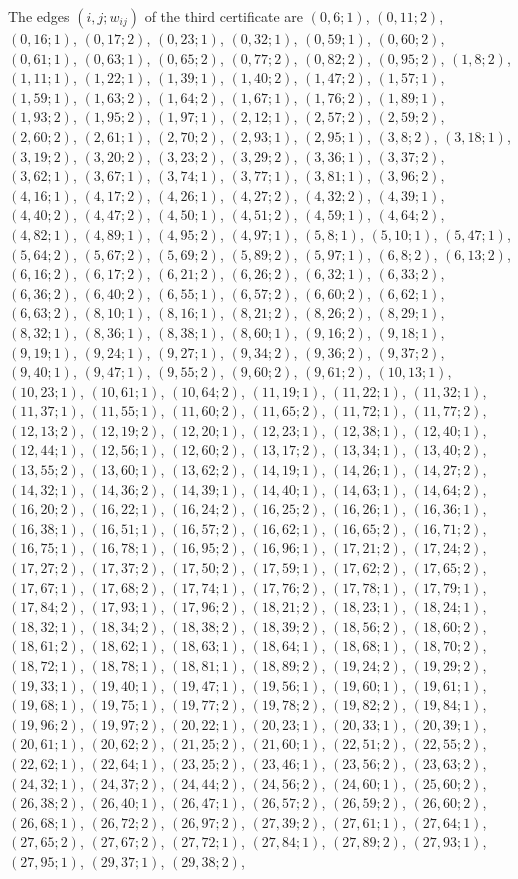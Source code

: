 \documentclass[11pt]{article}
\begin{document}
The edges $(i,j;w_{ij})$ of the third certificate are $(0,6;1)$, $(0,11;2)$, $(0,16;1)$, $(0,17;2)$, $(0,23;1)$, $(0,32;1)$, $(0,59;1)$, $(0,60;2)$, $(0,61;1)$, $(0,63;1)$, $(0,65;2)$, $(0,77;2)$, $(0,82;2)$, $(0,95;2)$, $(1,8;2)$, $(1,11;1)$, $(1,22;1)$, $(1,39;1)$, $(1,40;2)$, $(1,47;2)$, $(1,57;1)$, $(1,59;1)$, $(1,63;2)$, $(1,64;2)$, $(1,67;1)$, $(1,76;2)$, $(1,89;1)$, $(1,93;2)$, $(1,95;2)$, $(1,97;1)$, $(2,12;1)$, $(2,57;2)$, $(2,59;2)$, $(2,60;2)$, $(2,61;1)$, $(2,70;2)$, $(2,93;1)$, $(2,95;1)$, $(3,8;2)$, $(3,18;1)$, $(3,19;2)$, $(3,20;2)$, $(3,23;2)$, $(3,29;2)$, $(3,36;1)$, $(3,37;2)$, $(3,62;1)$, $(3,67;1)$, $(3,74;1)$, $(3,77;1)$, $(3,81;1)$, $(3,96;2)$, $(4,16;1)$, $(4,17;2)$, $(4,26;1)$, $(4,27;2)$, $(4,32;2)$, $(4,39;1)$, $(4,40;2)$, $(4,47;2)$, $(4,50;1)$, $(4,51;2)$, $(4,59;1)$, $(4,64;2)$, $(4,82;1)$, $(4,89;1)$, $(4,95;2)$, $(4,97;1)$, $(5,8;1)$, $(5,10;1)$, $(5,47;1)$, $(5,64;2)$, $(5,67;2)$, $(5,69;2)$, $(5,89;2)$, $(5,97;1)$, $(6,8;2)$, $(6,13;2)$, $(6,16;2)$, $(6,17;2)$, $(6,21;2)$, $(6,26;2)$, $(6,32;1)$, $(6,33;2)$, $(6,36;2)$, $(6,40;2)$, $(6,55;1)$, $(6,57;2)$, $(6,60;2)$, $(6,62;1)$, $(6,63;2)$, $(8,10;1)$, $(8,16;1)$, $(8,21;2)$, $(8,26;2)$, $(8,29;1)$, $(8,32;1)$, $(8,36;1)$, $(8,38;1)$, $(8,60;1)$, $(9,16;2)$, $(9,18;1)$, $(9,19;1)$, $(9,24;1)$, $(9,27;1)$, $(9,34;2)$, $(9,36;2)$, $(9,37;2)$, $(9,40;1)$, $(9,47;1)$, $(9,55;2)$, $(9,60;2)$, $(9,61;2)$, $(10,13;1)$, $(10,23;1)$, $(10,61;1)$, $(10,64;2)$, $(11,19;1)$, $(11,22;1)$, $(11,32;1)$, $(11,37;1)$, $(11,55;1)$, $(11,60;2)$, $(11,65;2)$, $(11,72;1)$, $(11,77;2)$, $(12,13;2)$, $(12,19;2)$, $(12,20;1)$, $(12,23;1)$, $(12,38;1)$, $(12,40;1)$, $(12,44;1)$, $(12,56;1)$, $(12,60;2)$, $(13,17;2)$, $(13,34;1)$, $(13,40;2)$, $(13,55;2)$, $(13,60;1)$, $(13,62;2)$, $(14,19;1)$, $(14,26;1)$, $(14,27;2)$, $(14,32;1)$, $(14,36;2)$, $(14,39;1)$, $(14,40;1)$, $(14,63;1)$, $(14,64;2)$, $(16,20;2)$, $(16,22;1)$, $(16,24;2)$, $(16,25;2)$, $(16,26;1)$, $(16,36;1)$, $(16,38;1)$, $(16,51;1)$, $(16,57;2)$, $(16,62;1)$, $(16,65;2)$, $(16,71;2)$, $(16,75;1)$, $(16,78;1)$, $(16,95;2)$, $(16,96;1)$, $(17,21;2)$, $(17,24;2)$, $(17,27;2)$, $(17,37;2)$, $(17,50;2)$, $(17,59;1)$, $(17,62;2)$, $(17,65;2)$, $(17,67;1)$, $(17,68;2)$, $(17,74;1)$, $(17,76;2)$, $(17,78;1)$, $(17,79;1)$, $(17,84;2)$, $(17,93;1)$, $(17,96;2)$, $(18,21;2)$, $(18,23;1)$, $(18,24;1)$, $(18,32;1)$, $(18,34;2)$, $(18,38;2)$, $(18,39;2)$, $(18,56;2)$, $(18,60;2)$, $(18,61;2)$, $(18,62;1)$, $(18,63;1)$, $(18,64;1)$, $(18,68;1)$, $(18,70;2)$, $(18,72;1)$, $(18,78;1)$, $(18,81;1)$, $(18,89;2)$, $(19,24;2)$, $(19,29;2)$, $(19,33;1)$, $(19,40;1)$, $(19,47;1)$, $(19,56;1)$, $(19,60;1)$, $(19,61;1)$, $(19,68;1)$, $(19,75;1)$, $(19,77;2)$, $(19,78;2)$, $(19,82;2)$, $(19,84;1)$, $(19,96;2)$, $(19,97;2)$, $(20,22;1)$, $(20,23;1)$, $(20,33;1)$, $(20,39;1)$, $(20,61;1)$, $(20,62;2)$, $(21,25;2)$, $(21,60;1)$, $(22,51;2)$, $(22,55;2)$, $(22,62;1)$, $(22,64;1)$, $(23,25;2)$, $(23,46;1)$, $(23,56;2)$, $(23,63;2)$, $(24,32;1)$, $(24,37;2)$, $(24,44;2)$, $(24,56;2)$, $(24,60;1)$, $(25,60;2)$, $(26,38;2)$, $(26,40;1)$, $(26,47;1)$, $(26,57;2)$, $(26,59;2)$, $(26,60;2)$, $(26,68;1)$, $(26,72;2)$, $(26,97;2)$, $(27,39;2)$, $(27,61;1)$, $(27,64;1)$, $(27,65;2)$, $(27,67;2)$, $(27,72;1)$, $(27,84;1)$, $(27,89;2)$, $(27,93;1)$, $(27,95;1)$, $(29,37;1)$, $(29,38;2)$, 
\end{document}

